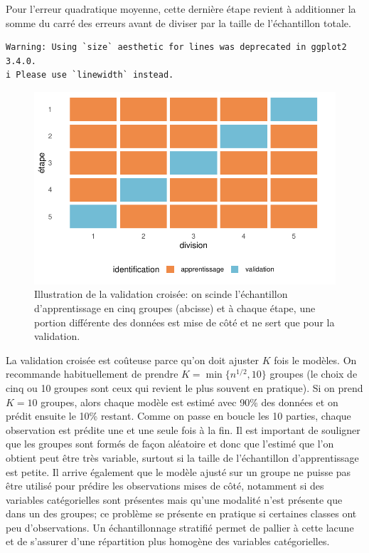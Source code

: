 \documentclass[
  11pt,
  letterpaper,
]{scrbook}
\theoremstyle{definition}
\theoremstyle{remark}
\begin{document}
Pour l'erreur quadratique moyenne, cette dernière étape revient à
additionner la somme du carré des erreurs avant de diviser par la taille
de l'échantillon totale.

\begin{verbatim}
Warning: Using `size` aesthetic for lines was deprecated in ggplot2 3.4.0.
i Please use `linewidth` instead.
\end{verbatim}

\begin{figure}[ht!]

{\centering \includegraphics[width=1\textwidth,height=\textheight]{./04-selectionmodeles_files/figure-pdf/fig-validationcroiseeillust-1.pdf}

}

\caption{\label{fig-validationcroiseeillust}Illustration de la
validation croisée: on scinde l'échantillon d'apprentissage en cinq
groupes (abcisse) et à chaque étape, une portion différente des données
est mise de côté et ne sert que pour la validation.}

\end{figure}

La validation croisée est coûteuse parce qu'on doit ajuster \(K\) fois
le modèles. On recommande habituellement de prendre
\(K=\min\{n^{1/2}, 10\}\) groupes (le choix de cinq ou 10 groupes sont
ceux qui revient le plus souvent en pratique). Si on prend \(K=10\)
groupes, alors chaque modèle est estimé avec 90\% des données et on
prédit ensuite le 10\% restant. Comme on passe en boucle les 10 parties,
chaque observation est prédite une et une seule fois à la fin. Il est
important de souligner que les groupes sont formés de façon aléatoire et
donc que l'estimé que l'on obtient peut être très variable, surtout si
la taille de l'échantillon d'apprentissage est petite. Il arrive
également que le modèle ajusté sur un groupe ne puisse pas être utilisé
pour prédire les observations mises de côté, notamment si des variables
catégorielles sont présentes mais qu'une modalité n'est présente que
dans un des groupes; ce problème se présente en pratique si certaines
classes ont peu d'observations. Un échantillonnage stratifié permet de
pallier à cette lacune et de s'assurer d'une répartition plus homogène
des variables catégorielles.
\end{document}
